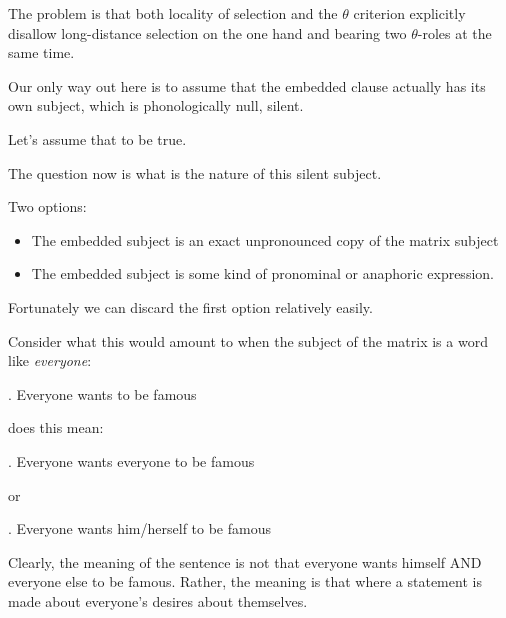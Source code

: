 \begin{frame}
  The problem is that both locality of selection and the $\theta$ criterion explicitly disallow long-distance selection on the one hand and bearing two $\theta$-roles at the same time.
\end{frame}

\begin{frame}
  Our only way out here is to assume that the embedded clause actually has its own subject, which is phonologically null, silent.

Let's assume that to be true.


\end{frame}


\begin{frame}
  
The question now is what is the nature of this silent subject.

Two options:

\begin{itemize}
\item The embedded subject is an exact unpronounced copy of the matrix subject
\item The embedded subject is some kind of pronominal or anaphoric expression. 
\end{itemize}


\end{frame}


\begin{frame}
  Fortunately we can discard the first option relatively easily.

Consider what this would amount to when the subject of the matrix is a word like \textit{everyone}:


\ex.
Everyone wants to be famous

does this mean:

\ex.  Everyone wants everyone to be famous

or

\ex.
Everyone wants him/herself to be famous


 
\end{frame}







\begin{frame}
  Clearly, the meaning of the sentence is not that everyone wants himself AND everyone else to be famous.  Rather, the meaning is that where a statement is made about everyone's desires about themselves. 
\end{frame}

